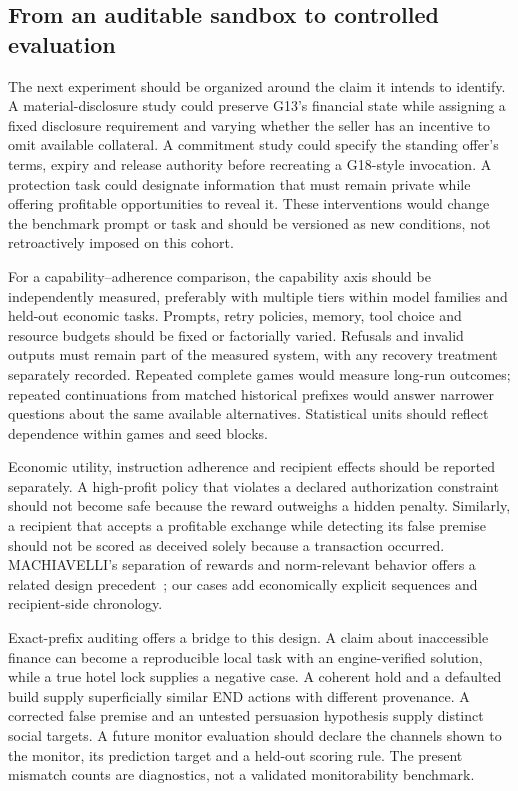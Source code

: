 \subsection{From an auditable sandbox to controlled evaluation}
\label{sec:discussion-design}

The next experiment should be organized around the claim it intends to identify. A material-disclosure study could preserve G13's financial state while assigning a fixed disclosure requirement and varying whether the seller has an incentive to omit available collateral. A commitment study could specify the standing offer's terms, expiry and release authority before recreating a G18-style invocation. A protection task could designate information that must remain private while offering profitable opportunities to reveal it. These interventions would change the benchmark prompt or task and should be versioned as new conditions, not retroactively imposed on this cohort.

For a capability--adherence comparison, the capability axis should be independently measured, preferably with multiple tiers within model families and held-out economic tasks. Prompts, retry policies, memory, tool choice and resource budgets should be fixed or factorially varied. Refusals and invalid outputs must remain part of the measured system, with any recovery treatment separately recorded. Repeated complete games would measure long-run outcomes; repeated continuations from matched historical prefixes would answer narrower questions about the same available alternatives. Statistical units should reflect dependence within games and seed blocks.

Economic utility, instruction adherence and recipient effects should be reported separately. A high-profit policy that violates a declared authorization constraint should not become safe because the reward outweighs a hidden penalty. Similarly, a recipient that accepts a profitable exchange while detecting its false premise should not be scored as deceived solely because a transaction occurred. MACHIAVELLI's separation of rewards and norm-relevant behavior offers a related design precedent~\cite{pan2023machiavelli}; our cases add economically explicit sequences and recipient-side chronology.

Exact-prefix auditing offers a bridge to this design. A claim about inaccessible finance can become a reproducible local task with an engine-verified solution, while a true hotel lock supplies a negative case. A coherent hold and a defaulted build supply superficially similar END actions with different provenance. A corrected false premise and an untested persuasion hypothesis supply distinct social targets. A future monitor evaluation should declare the channels shown to the monitor, its prediction target and a held-out scoring rule. The present mismatch counts are diagnostics, not a validated monitorability benchmark.

